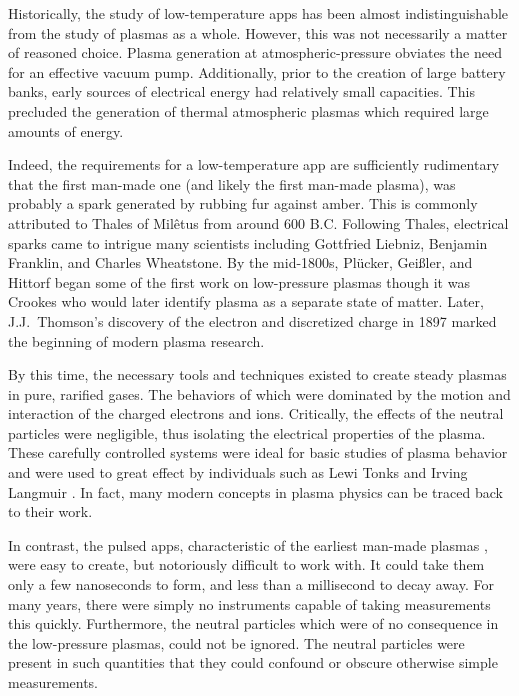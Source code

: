 Historically, the study of low-temperature \acs{app}s has been almost
indistinguishable from the study of plasmas as a whole. However, this was not
necessarily a matter of reasoned choice. Plasma generation at
atmospheric-pressure obviates the need for an effective vacuum pump.
Additionally, prior to the creation of large battery banks, early sources of
electrical energy had relatively small capacities. This precluded the generation
of thermal atmospheric plasmas which required large amounts of energy.

Indeed, the requirements for a low-temperature \acs{app} are sufficiently
rudimentary that the first man-made one (and likely the first man-made plasma),
was probably a spark generated by rubbing fur against amber. This is commonly
attributed to Thales of Mil\^{e}tus from around 600 B.C. Following Thales,
electrical sparks came to intrigue many scientists including Gottfried Liebniz,
Benjamin Franklin, and Charles Wheatstone. By the mid-1800s, Pl\"{u}cker,
Gei\ss{}ler, and Hittorf began some of the first work on low-pressure plasmas
though it was Crookes who would later identify plasma as a separate state of
matter. Later, J.J.\ Thomson's discovery of the electron and discretized charge
in 1897 marked the beginning of modern plasma research.

By this time, the necessary tools and techniques existed to create steady
plasmas in pure, rarified gases. The behaviors of which were dominated by the
motion and interaction of the charged electrons and ions. Critically, the
effects of the neutral particles were negligible, thus isolating the electrical
properties of the plasma. These carefully controlled systems were ideal for
basic studies of plasma behavior and were used to great effect by individuals
such as Lewi Tonks and Irving Langmuir \cite{Tonks1929}. In fact, many modern
concepts in plasma physics can be traced back to their work.

In contrast, the pulsed \acs{app}s, characteristic of the earliest man-made
plasmas \cite{Anders2003}, were easy to create, but notoriously difficult to
work with. It could take them only a few nanoseconds to form, and less than a
millisecond to decay away. For many years, there were simply no instruments
capable of taking measurements this quickly. Furthermore, the neutral particles
which were of no consequence in the low-pressure plasmas, could not be ignored.
The neutral particles were present in such quantities that they could confound
or obscure otherwise simple measurements.


